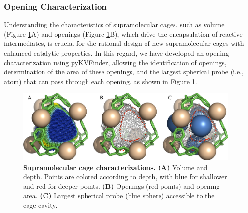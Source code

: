 \documentclass[Ingles]{phdthesis}
\def\ie{i.e.\onedot}
\begin{document}
\subsubsection{Opening Characterization}

Understanding the characteristics of supramolecular cages, such as volume (Figure \ref{fig:cage-characterization}A) and openings (Figure \ref{fig:cage-characterization}B), which drive the encapsulation of reactive intermediates, is crucial for the rational design of new supramolecular cages with enhanced catalytic properties. In this regard, we have developed an opening characterization using pyKVFinder, allowing the identification of openings, determination of the area of these openings, and the largest spherical probe (\ie, atom) that can pass through each opening, as shown in Figure \ref{fig:cage-characterization}.

\begin{figure}[ht]
  \centering
  \includegraphics[scale=1.2]{images/cage-characterization.png}
  \caption[Supramolecular cage characterizations]{\textbf{Supramolecular cage characterizations.} \textbf{(A)} Volume and depth. Points are colored according to depth, with blue for shallower and red for deeper points. \textbf{(B)} Openings (red points) and opening area. \textbf{(C)} Largest spherical probe (blue sphere) accessible to the cage cavity.}
  \label{fig:cage-characterization}
\end{figure}
\end{document}
